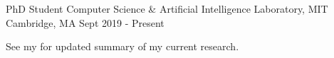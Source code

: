 

\begin{cventries}

  \cventry
    {PhD Student} %
    {Computer Science \& Artificial Intelligence Laboratory, MIT} %
    {Cambridge, MA} %
    {Sept 2019 - Present} %
    {
      \begin{cvitems} %
        \item{See my  for updated summary of my current research.}
      \end{cvitems}
    }



\end{cventries}
